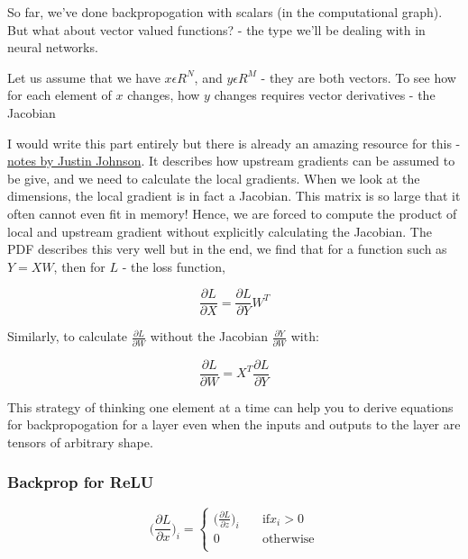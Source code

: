So far, we've done backpropogation with scalars (in the computational graph). But what about vector valued functions? - the type we'll be dealing with in neural networks.

Let us assume that we have $x \epsilon R^N$, and $y \epsilon R^M$ - they are both vectors. To see how for each element of $x$ changes, how $y$ changes requires vector derivatives - the Jacobian

I would write this part entirely but there is already an amazing resource for this - \href{https://github.com/RoboticsIIITH/summer-sessions-2020/blob/master/lecture-slides/deep_learning/backprop_linear_layer.pdf}{notes by Justin Johnson}. It describes how upstream gradients can be assumed to be give, and we need to calculate the local gradients. When we look at the dimensions, the local gradient is in fact a Jacobian. This matrix is so large that it often cannot even fit in memory! Hence, we are forced to compute the product of local and upstream gradient without explicitly calculating the Jacobian. The PDF describes this very well but in the end, we find that for a function such as $Y=XW$, then for $L$ - the loss function, 

\begin{equation}
    \frac{\partial L}{\partial X} = \frac{\partial L}{\partial Y} W^T
\end{equation}

Similarly, to calculate $\frac{\partial L}{\partial W}$ without the Jacobian $\frac{\partial Y}{\partial W}$ with:

\begin{equation}
    \frac{\partial L}{\partial W} = X^T \frac{\partial L}{\partial Y}
\end{equation}

This strategy of thinking one element at a time can help you to derive equations for backpropogation for a layer even when the inputs and outputs to the layer are tensors of arbitrary shape.

\subsubsection{Backprop for ReLU}

\begin{equation}
    \Big( \frac{\partial L}{\partial x} \Big)_{i} = \begin{cases}
       \Big(\frac{\partial L}{\partial z} \Big)_{i} &\quad\text{if} x_i > 0\\
       \text{0} &\quad\text{otherwise}\\
     \end{cases}
\end{equation}

